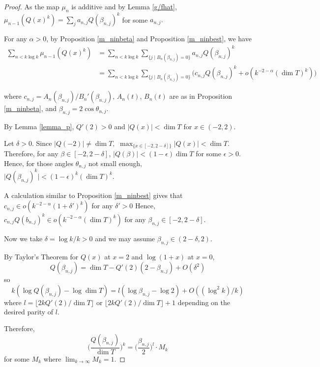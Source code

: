 \documentclass[11 pt]{amsart}
\theoremstyle{plain}
\theoremstyle{definition}
\theoremstyle{remark}
\def\b{\beta}
\def\m{\mu}
\begin{document}
\begin{proof}
    
    As the map $\m_n$ is additive and by Lemma \ref{g/fhat}, $\m_{n-1}(Q(x)^k)=\sum_j a_{n, j}Q(\b_{n, j})^k$ for some $a_{n,j}.$ 

    For any $\alpha>0$, by Proposition \ref{m_ninbeta} and Proposition \ref{m_ninbest},  we have
     \begin{align*}
        \sum_{n< k \log k} \m_{n-1}(Q(x)^k)&=\sum_{n< k \log k} \sum_{\{j \mid B_n(\b_{n, j})=0\}} a_{n, j}Q(\b_{n, j})^k\\
        &=\sum_{n< k \log k} \sum_{\{j \mid B_n(\b_{n, j})=0\}}\Big( c_{n, j}Q(\b_{n, j})^k  +o(k^{-2-\alpha} (\dim T)^k )\Big)
    \end{align*}

    where $c_{n, j}=A_n(\b_{n,j})/B_n'(\b_{n,j})$, $A_n(t)$, $B_n(t)$ are as in Proposition \ref{m_ninbeta}, and $\b_{n, j}=2\cos \theta_{n, j}$.



    By Lemma \ref{lemma_p}, $Q'(2)>0$ and $\vert Q(x) \vert < \dim T$ for $x \in (-2, 2)$. 
    
    Let $\delta >0$. Since $\vert Q(-2) \vert \neq \dim T,$  $\max _{\{x\in [-2, 2-\delta]\}} \vert Q(x) \vert < \dim T$. Therefore,  for any $\b\in [-2, 2-\delta]$, $\vert Q(\b) \vert < (1-\epsilon)\dim T$ for some $\epsilon>0.$ Hence, for those angles $\theta_{n, j}$ not small enough, $\vert Q(\b_{n, j})^k \vert < (1-\epsilon)^k(\dim T)^k.$ 

   

    A calculation similar to Proposition \ref{m_ninbest} gives that $c_{n, j}\in o(k^{-2-\alpha}(1+\delta')^k)$ for any $\delta'>0$ Hence, $c_{n, j}Q(b_{n, j})^k \in o(k^{-2-\alpha} (\dim T)^k )$ for any $\b_{n, j}\in [-2, 2-\delta].$
    
    
    Now we take $\delta=\log k/k>0$ and we may assume $\b_{n, j}\in (2-\delta, 2).$

    By Taylor's Theorem for $Q(x)$ at $x=2$ and $\log(1+x)$ at $x=0$,   \begin{equation}
        Q(\b_{n, j})=\dim T - Q'(2) (2- \b_{n, j})+ O(\delta^2) 
    \end{equation}
    so
    \begin{equation} \label{choosel}
        k(\log Q(\b_{n,j})- \log \dim T )=l(\log \b_{n, j}- \log 2)+O((\log^2 k)/k)
    \end{equation}
where $l=\lfloor 2kQ'(2)/ \dim T \rfloor$ or $\lfloor 2kQ'(2)/ \dim T \rfloor+1$ depending on the desired parity of $l$.


Therefore, \begin{equation} \label{M_k}
    \bigg(\frac{Q(\b_{n, j})}{\dim T} \bigg)^k=\big(\frac{\b_{n, j}}{2} \big)^l \cdot M_k
\end{equation}
    for some $M_k$ where $\lim_{k \to \infty} M_k=1.$



\end{proof}
\end{document}
